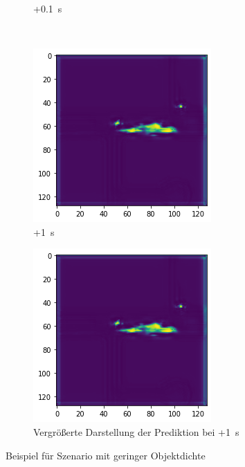 \documentclass[12pt]{article}
\begin{document}
\begin{figure}[H]
\begin{subfigure}[b]{0.18\textwidth}
            \caption{+0.1~s}
        \end{subfigure}
        ~
        \begin{subfigure}[b]{0.18\textwidth}
            \includegraphics[width=\textwidth]{output_low_dens_4.png}
            \caption{+1~s}
        \end{subfigure}
        \vspace{1cm}
        \begin{subfigure}[b]{0.6\textwidth}
            \includegraphics[width=\textwidth]{output_low_dens_4.png}
            \caption{Vergrößerte Darstellung der Prediktion bei +1~s}
        \end{subfigure}
        \caption{Beispiel für Szenario mit geringer Objektdichte}\label{fig:out_low_dens}
    \end{figure}
\end{document}
